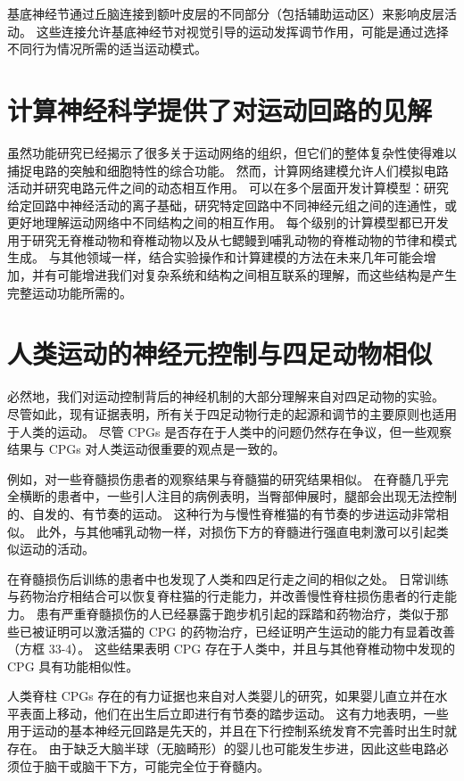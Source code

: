 基底神经节通过丘脑连接到额叶皮层的不同部分（包括辅助运动区）来影响皮层活动。
这些连接允许基底神经节对视觉引导的运动发挥调节作用，可能是通过选择不同行为情况所需的适当运动模式。



\section{计算神经科学提供了对运动回路的见解}

虽然功能研究已经揭示了很多关于运动网络的组织，但它们的整体复杂性使得难以捕捉电路的突触和细胞特性的综合功能。
然而，计算网络建模允许人们模拟电路活动并研究电路元件之间的动态相互作用。
可以在多个层面开发计算模型：研究给定回路中神经活动的离子基础，研究特定回路中不同神经元组之间的连通性，或更好地理解运动网络中不同结构之间的相互作用。
每个级别的计算模型都已开发用于研究无脊椎动物和脊椎动物以及从七鳃鳗到哺乳动物的脊椎动物的节律和模式生成。
与其他领域一样，结合实验操作和计算建模的方法在未来几年可能会增加，并有可能增进我们对复杂系统和结构之间相互联系的理解，而这些结构是产生完整运动功能所需的。


\section{人类运动的神经元控制与四足动物相似}

必然地，我们对运动控制背后的神经机制的大部分理解来自对四足动物的实验。
尽管如此，现有证据表明，所有关于四足动物行走的起源和调节的主要原则也适用于人类的运动。
尽管 CPGs 是否存在于人类中的问题仍然存在争议，但一些观察结果与 CPGs 对人类运动很重要的观点是一致的。


例如，对一些脊髓损伤患者的观察结果与脊髓猫的研究结果相似。
在脊髓几乎完全横断的患者中，一些引人注目的病例表明，当臀部伸展时，腿部会出现无法控制的、自发的、有节奏的运动。
这种行为与慢性脊椎猫的有节奏的步进运动非常相似。
此外，与其他哺乳动物一样，对损伤下方的脊髓进行强直电刺激可以引起类似运动的活动。


在脊髓损伤后训练的患者中也发现了人类和四足行走之间的相似之处。
日常训练与药物治疗相结合可以恢复脊柱猫的行走能力，并改善慢性脊柱损伤患者的行走能力。
患有严重脊髓损伤的人已经暴露于跑步机引起的踩踏和药物治疗，类似于那些已被证明可以激活猫的 CPG 的药物治疗，已经证明产生运动的能力有显着改善（方框 33-4）。
这些结果表明 CPG 存在于人类中，并且与其他脊椎动物中发现的 CPG 具有功能相似性。


人类脊柱 CPGs 存在的有力证据也来自对人类婴儿的研究，如果婴儿直立并在水平表面上移动，他们在出生后立即进行有节奏的踏步运动。
这有力地表明，一些用于运动的基本神经元回路是先天的，并且在下行控制系统发育不完善时出生时就存在。
由于缺乏大脑半球（无脑畸形）的婴儿也可能发生步进，因此这些电路必须位于脑干或脑干下方，可能完全位于脊髓内。


